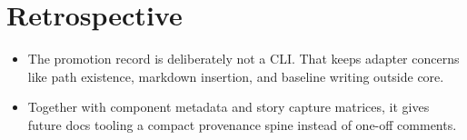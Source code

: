 \section{Retrospective}\label{record-090-retrospective}

\begin{itemize}
\tightlist
\item
  The promotion record is deliberately not a CLI. That keeps adapter concerns like path existence, markdown insertion, and baseline writing outside core.
\item
  Together with component metadata and story capture matrices, it gives future docs tooling a compact provenance spine instead of one-off comments.
\end{itemize}

